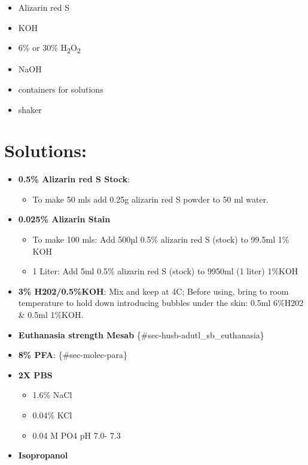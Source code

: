 \documentclass[
  letterpaper,
  DIV=11,
  numbers=noendperiod]{scrreprt}
\providecommand{\tightlist}{%
  \setlength{\itemsep}{0pt}\setlength{\parskip}{0pt}}\usepackage{longtable,booktabs,array}
\begin{document}
\begin{itemize}
\tightlist
\item
  Alizarin red S
\item
  KOH
\item
  6\% or 30\% H\textsubscript{2}O\textsubscript{2}
\item
  NaOH
\item
  containers for solutions
\item
  shaker
\end{itemize}

\hypertarget{solutions-17}{%
\section{Solutions:}\label{solutions-17}}

\begin{itemize}
\tightlist
\item
  \textbf{0.5\% Alizarin red S Stock}:

  \begin{itemize}
  \tightlist
  \item
    To make 50 mls add 0.25g alizarin red S powder to 50 ml water.
  \end{itemize}
\item
  \textbf{0.025\% Alizarin Stain}

  \begin{itemize}
  \tightlist
  \item
    To make 100 mls: Add 500µl 0.5\% alizarin red S (stock) to 99.5ml
    1\% KOH
  \item
    1 Liter: Add 5ml 0.5\% alizarin red S (stock) to 9950ml (1 liter)
    1\%KOH
  \end{itemize}
\item
  \textbf{3\% H202/0.5\%KOH}: Mix and keep at 4C; Before using, bring to
  room temperature to hold down introducing bubbles under the skin:
  0.5ml 6\%H202 \& 0.5ml 1\%KOH.
\item
  \textbf{Euthanasia strength Mesab}
  \{\#sec-husb-adutl\_sb\_euthanasia\}
\item
  \textbf{8\% PFA}: \{\#sec-molec-para\}
\item
  \textbf{2X PBS}

  \begin{itemize}
  \tightlist
  \item
    1.6\% NaCl
  \item
    0.04\% KCl
  \item
    0.04 M PO4 pH 7.0- 7.3
  \end{itemize}
\item
  \textbf{Isopropanol}
\end{itemize}
\end{document}
